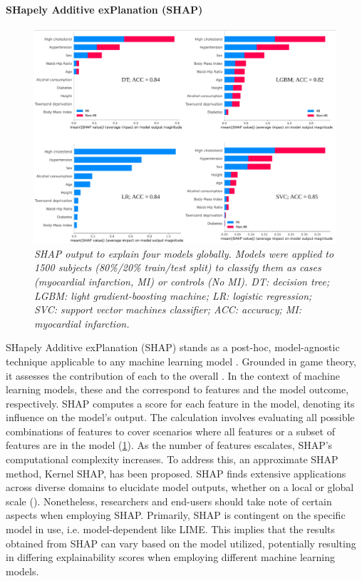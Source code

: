 \documentclass[binding=0.6cm]{sapthesis}
\begin{document}
\paragraph{SHapely Additive exPlanation (SHAP)}
\label{sec:bg.xai.shap}
\begin{figure}
    \centering
    \includegraphics[width=\textwidth]{imgs/background/shap-example.png}
    \caption{\textit{SHAP output to explain four models globally. Models were applied to 1500 subjects (80\%/20\% train/test split) to classify them as cases (myocardial infarction, MI) or controls (No MI).  DT: decision tree; LGBM: light gradient-boosting machine; LR: logistic regression; SVC: support vector machines classifier; ACC: accuracy; MI: myocardial infarction.}}
    \label{fig:bg.xai.shapley}
\end{figure}
SHapely Additive exPlanation (SHAP) stands as a post-hoc, model-agnostic technique applicable to any machine learning model \cite{lundberg2017-shap}. Grounded in game theory, it assesses the contribution of each  to the overall . In the context of machine learning models, these  and the  correspond to features and the model outcome, respectively. SHAP computes a score for each feature in the model, denoting its influence on the model's output. The calculation involves evaluating all possible combinations of features to cover scenarios where all features or a subset of features are in the model (\cref{fig:bg.xai.shapley}). As the number of features escalates, SHAP's computational complexity increases. To address this, an approximate SHAP method, Kernel SHAP, has been proposed. SHAP finds extensive applications across diverse domains to elucidate model outputs, whether on a local or global scale     (\cite{garcia2020-no2-shap,yesuel2022-heat-shap,ullah2023-grey-wolf}). Nonetheless, researchers and end-users should take note of certain aspects when employing SHAP. Primarily, SHAP is contingent on the specific model in use, i.e. model-dependent like LIME. This implies that the results obtained from SHAP can vary based on the model utilized, potentially resulting in differing explainability scores when employing different machine learning models.
\end{document}
